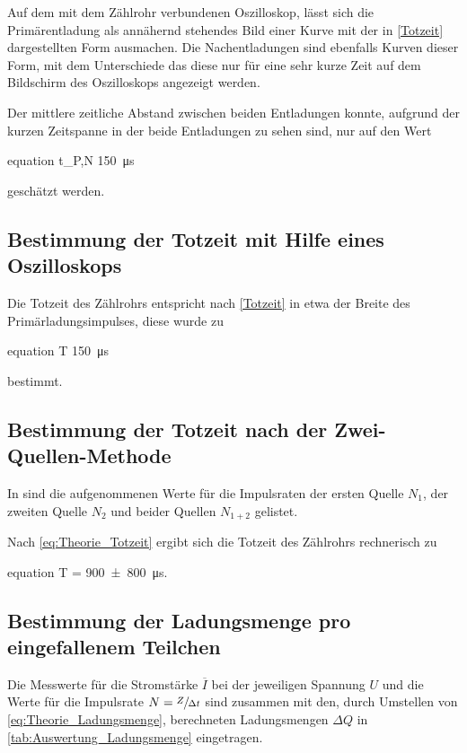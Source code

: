 	Auf dem mit dem Zählrohr verbundenen Oszilloskop, lässt sich die Primärentladung als 
	annähernd stehendes Bild einer Kurve mit der in \cref{Totzeit} dargestellten Form 
	ausmachen. Die Nachentladungen sind ebenfalls Kurven dieser Form, mit dem Unterschiede
	das diese nur für eine sehr kurze Zeit auf dem Bildschirm des Oszilloskops angezeigt werden.
	
	Der mittlere zeitliche Abstand zwischen beiden Entladungen konnte, aufgrund der kurzen Zeitspanne 
	in der beide Entladungen zu sehen sind, nur auf den Wert
	\begin{empheq}{equation}
		\label{val:Primaer_Nachentladung_Oszilloskop}
		\Delta t_{P,N} \approx \SI{150}{\micro\second}
	\end{empheq} 
	geschätzt werden.
	 

\subsection{Bestimmung der Totzeit mit Hilfe eines Oszilloskops}

	Die Totzeit des Zählrohrs entspricht nach \cref{Totzeit} in etwa der 
	Breite des Primärladungsimpulses, diese wurde zu
	\begin{empheq}{equation}
		\label{val:Totzeit_Oszilloskop}
		T \approx \SI{150}{\micro\second}
	\end{empheq} 
	bestimmt.
	

\subsection{Bestimmung der Totzeit nach der Zwei-Quellen-Methode}

	In sind die aufgenommenen Werte für die Impulsraten der ersten Quelle
	$N_{1}$, der zweiten Quelle $N_{2}$ und beider Quellen $N_{1+2}$ gelistet.
	
	

	Nach \cref{eq:Theorie_Totzeit} ergibt sich die Totzeit des Zählrohrs 
	rechnerisch zu 
	\begin{empheq}{equation}
		T = \SI{900(800)}{\micro\second}.
		\label{val:Totzeit_Berechnet}	
	\end{empheq}	
	
\subsection{Bestimmung der Ladungsmenge pro eingefallenem Teilchen}	
	
	Die Messwerte für die Stromstärke $\overline{I}$ bei der jeweiligen Spannung
	$U$ und die Werte für die Impulsrate $N = \sfrac{Z}{\Delta t}$ sind zusammen mit
	den, durch Umstellen von \cref{eq:Theorie_Ladungsmenge}, berechneten Ladungsmengen
	$\Delta Q$ in \cref{tab:Auswertung_Ladungsmenge} eingetragen.
	
	
	


